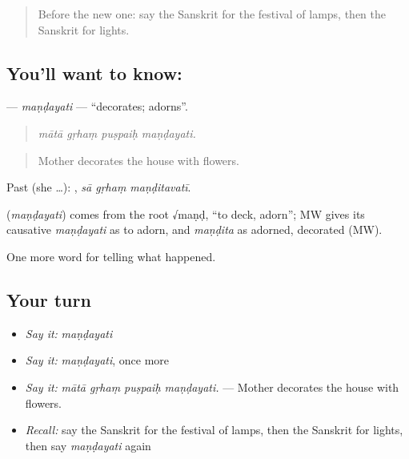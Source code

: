 \label{lesson:SA-C326-mandayati}



\begin{quote}
Before the new one: say the Sanskrit for the festival of lamps, then the Sanskrit for lights.
\end{quote}

\subsection*{You'll want to know: }
\textbf{} — \emph{maṇḍayati} — \textquotedblleft{}decorates; adorns\textquotedblright{}.

\begin{quote}
   
\end{quote}

\begin{quote}
\emph{mātā gṛhaṃ puṣpaiḥ maṇḍayati.}
\end{quote}

\begin{quote}
Mother decorates the house with flowers.
\end{quote}

Past (she …):   , \emph{sā gṛhaṃ maṇḍitavatī}.

\begin{cousinweb}
\textbf{} (\emph{maṇḍayati}) comes from the root √maṇḍ, \textquotedblleft{}to deck, adorn\textquotedblright{}; MW gives its causative \emph{maṇḍayati} as to adorn, and \emph{maṇḍita} as adorned, decorated (MW).
\end{cousinweb}

\begin{grammarlens}[title={What you've built}]
One more word for telling what happened.
\end{grammarlens}

\subsection*{Your turn}
\begin{itemize}
\raggedright
  \item \emph{Say it:} \emph{maṇḍayati}
  \item \emph{Say it:} \emph{maṇḍayati}, once more
  \item \emph{Say it:} \emph{mātā gṛhaṃ puṣpaiḥ maṇḍayati.} — Mother decorates the house with flowers.
  \item \emph{Recall:} say the Sanskrit for the festival of lamps, then the Sanskrit for lights, then say \emph{maṇḍayati} again
\end{itemize}

